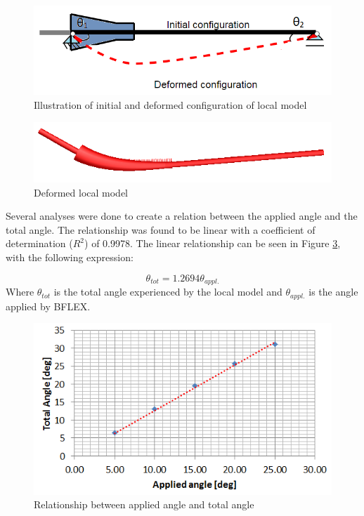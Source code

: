 \begin{figure}[H]
\centering
\includegraphics[scale=0.75]{figures/anglecorr1}
\caption[Initial and deformed configuration of local model]{Illustration of initial and deformed configuration of local model}
 \label{fig:anglecorr1}
\end{figure}

\begin{figure}[H]
\centering
\includegraphics[scale=0.75]{figures/anglecorrre}
\caption[Deformed local model]{Deformed local model}
 \label{fig:anglecorrre}
\end{figure}

\noindent Several analyses were done to create a relation between the applied angle and the total angle. The relationship was found to be linear with a coefficient of determination ($R^2$) of 0.9978. The linear relationship can be seen in Figure \ref{fig:anglerel}, with the following expression:

\begin{equation}
    \theta_{tot}=1.2694\theta_{appl.}
\end{equation}
Where $\theta_{tot}$ is the total angle experienced by the local model and $\theta_{appl.}$ is the angle applied by BFLEX.
\begin{figure}[H]
\centering
\includegraphics[scale=0.8]{figures/anglerel}
\caption[Relationship between applied angle and total angle]{Relationship between applied angle and total angle}
 \label{fig:anglerel}
\end{figure}

